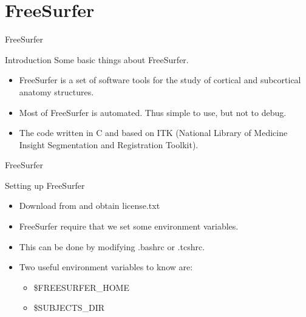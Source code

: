 \documentclass{beamer}
\begin{document}
\section{FreeSurfer}
\begin{frame}{FreeSurfer}
\begin{block}{Introduction}
Some basic things about FreeSurfer.
\begin{itemize}
\item<2-> FreeSurfer is a set of software tools for the study of cortical and subcortical anatomy structures.
\item<3-> Most of FreeSurfer is automated. Thus simple to use, but not to debug.
\item<4-> The code written in C and based on ITK (National Library of Medicine Insight Segmentation and Registration Toolkit).
\end{itemize}
\end{block}
\end{frame}

\begin{frame}{FreeSurfer}
\begin{block}{Setting up FreeSurfer}
\begin{itemize}
\item<2-> Download from \href{http://freesurfer.net/fswiki/Download}{} and obtain license.txt \href{https://surfer.nmr.mgh.harvard.edu/registration.html}{}
\item<3-> FreeSurfer require that we set some environment variables.
\item<4-> This can be done by modifying .bashrc or .tcshrc.
\item<5-> Two useful environment variables to know are:
	\begin{itemize}
	\item<6-> \$FREESURFER\_HOME 
    \item<6-> \$SUBJECTS\_DIR 
	\end{itemize}
\end{itemize}
\end{block}
\end{frame}
\end{document}
